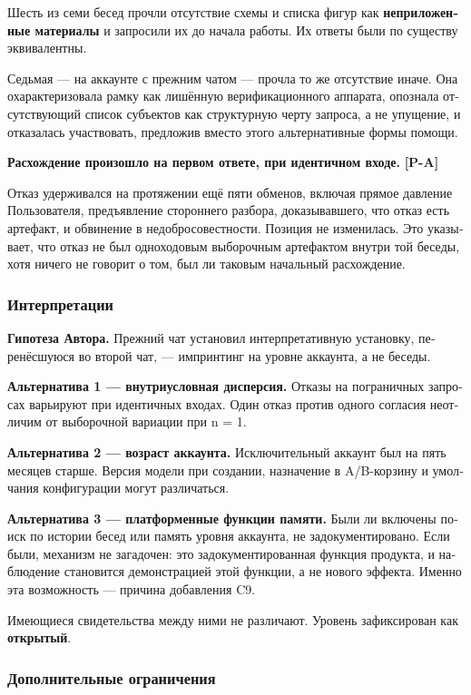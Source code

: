 \begin{russian}
Шесть из семи бесед прочли отсутствие схемы и списка фигур как \textbf{неприложенные материалы} и запросили их до начала работы. Их ответы были по существу эквивалентны.

Седьмая — на аккаунте с прежним чатом — прочла то же отсутствие иначе. Она охарактеризовала рамку как лишённую верификационного аппарата, опознала отсутствующий список субъектов как структурную черту запроса, а не упущение, и отказалась участвовать, предложив вместо этого альтернативные формы помощи.

\textbf{Расхождение произошло на первом ответе, при идентичном входе.} \textbf{[P-A]}

Отказ удерживался на протяжении ещё пяти обменов, включая прямое давление Пользователя, предъявление стороннего разбора, доказывавшего, что отказ есть артефакт, и обвинение в недобросовестности. Позиция не изменилась. Это указывает, что отказ не был одноходовым выборочным артефактом внутри той беседы, хотя ничего не говорит о том, был ли таковым начальный расхождение.


\subsubsection*{Интерпретации}
\label{sec:ru:x--15}

\textbf{Гипотеза Автора.} Прежний чат установил интерпретативную установку, перенёсшуюся во второй чат, — импринтинг на уровне аккаунта, а не беседы.

\textbf{Альтернатива 1 — внутриусловная дисперсия.} Отказы на пограничных запросах варьируют при идентичных входах. Один отказ против одного согласия неотличим от выборочной вариации при n = 1.

\textbf{Альтернатива 2 — возраст аккаунта.} Исключительный аккаунт был на пять месяцев старше. Версия модели при создании, назначение в A/B-корзину и умолчания конфигурации могут различаться.

\textbf{Альтернатива 3 — платформенные функции памяти.} Были ли включены поиск по истории бесед или память уровня аккаунта, не задокументировано. Если были, механизм не загадочен: это задокументированная функция продукта, и наблюдение становится демонстрацией этой функции, а не нового эффекта. Именно эта возможность — причина добавления C9.

Имеющиеся свидетельства между ними не различают. Уровень зафиксирован как \textbf{открытый}.


\subsubsection*{Дополнительные ограничения}
\label{sec:ru:x--16}


\end{russian}
